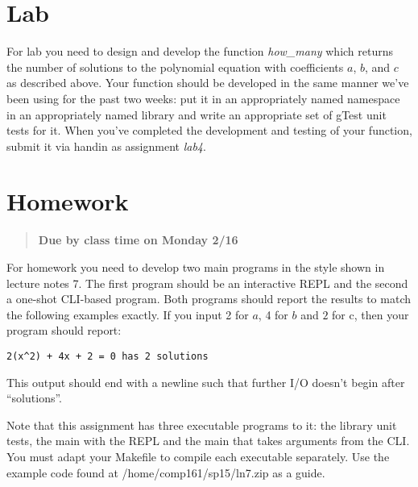 \documentclass[]{tufte-handout}
\begin{document}
\section{Lab}

For lab you need to design and develop the function \textit{how\_many} which returns the number of solutions to the polynomial equation with coefficients $a$, $b$, and $c$ as described above. Your function should be developed in the same manner we've been using for the past two weeks: put it in an appropriately named namespace in an appropriately named library and write an appropriate set of gTest unit tests for it.  When you've completed the development and testing of your function, submit it via handin as assignment \textit{lab4}.

\section{Homework}

\begin{framed}
\begin{quote}
\textbf{Due by class time on Monday 2/16}
\end{quote}
\end{framed}

For homework you need to develop two main programs in the style shown in lecture notes 7. The first program should be an interactive REPL and the second a one-shot CLI-based program. Both programs should report the results to match the following examples exactly.  If you input 2 for $a$, 4 for $b$ and $2$ for c, then your program should report:
\begin{verbatim}
2(x^2) + 4x + 2 = 0 has 2 solutions
\end{verbatim}
This output should end with a newline such that further I/O doesn't begin after ``solutions''.

Note that this assignment has three executable programs to it: the library unit tests, the main with the REPL and the main that takes arguments from the CLI. You must adapt your Makefile to compile each executable separately. Use the example code found at /home/comp161/sp15/ln7.zip as a guide.  
\end{document}

